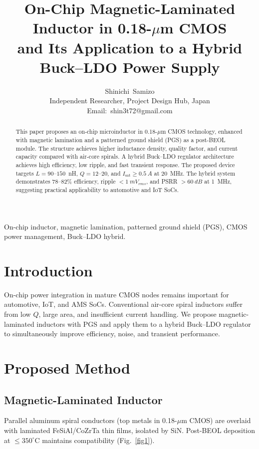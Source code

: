 \documentclass[journal]{IEEEtran}
\begin{document}
\title{On-Chip Magnetic-Laminated Inductor in 0.18-$\mu$m CMOS\\
and Its Application to a Hybrid Buck--LDO Power Supply}

\author{Shinichi~Samizo\\
Independent Researcher, Project Design Hub, Japan\\
Email:~shin3t72@gmail.com
}

\maketitle

\begin{abstract}
This paper proposes an on-chip microinductor in 0.18-$\mu$m CMOS technology, enhanced with magnetic lamination and a patterned ground shield (PGS) as a post-BEOL module. The structure achieves higher inductance density, quality factor, and current capacity compared with air-core spirals. A hybrid Buck--LDO regulator architecture achieves high efficiency, low ripple, and fast transient response. The proposed device targets $L=90$--$150$~nH, $Q=12$--$20$, and $I_{\text{sat}} \ge \SI{0.5}{A}$ at \SI{20}{MHz}. The hybrid system demonstrates 78--82\% efficiency, ripple $<\SI{1}{mV_{rms}}$, and PSRR $>\SI{60}{dB}$ at \SI{1}{MHz}, suggesting practical applicability to automotive and IoT SoCs.
\end{abstract}

\begin{IEEEkeywords}
On-chip inductor, magnetic lamination, patterned ground shield (PGS), CMOS power management, Buck--LDO hybrid.
\end{IEEEkeywords}

\section{Introduction}
On-chip power integration in mature CMOS nodes remains important for automotive, IoT, and AMS SoCs. Conventional air-core spiral inductors suffer from low $Q$, large area, and insufficient current handling. We propose magnetic-laminated inductors with PGS and apply them to a hybrid Buck--LDO regulator to simultaneously improve efficiency, noise, and transient performance.

\section{Proposed Method}
\subsection{Magnetic-Laminated Inductor}
Parallel aluminum spiral conductors (top metals in 0.18-$\mu$m CMOS) are overlaid with laminated FeSiAl/CoZrTa thin films, isolated by SiN. Post-BEOL deposition at $\le 350^\circ$C maintains compatibility (Fig.~\ref{fig1}).
\end{document}
